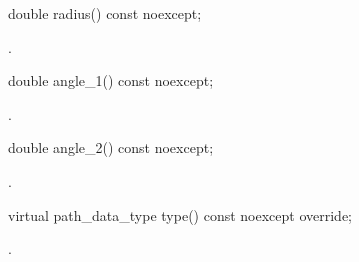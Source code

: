 \begin{itemdecl}
    double radius() const noexcept;
\end{itemdecl}
\begin{itemdescr}
	\pnum
	\returns
	.
\end{itemdescr}

\begin{itemdecl}
    double angle_1() const noexcept;
\end{itemdecl}
\begin{itemdescr}
	\pnum
	\returns
	.
\end{itemdescr}

\begin{itemdecl}
    double angle_2() const noexcept;
\end{itemdecl}
\begin{itemdescr}
	\pnum
	\returns
	.
\end{itemdescr}

\begin{itemdecl}
    virtual path_data_type type() const noexcept override;
\end{itemdecl}
\begin{itemdescr}
	\pnum
	\returns
	.
\end{itemdescr}
